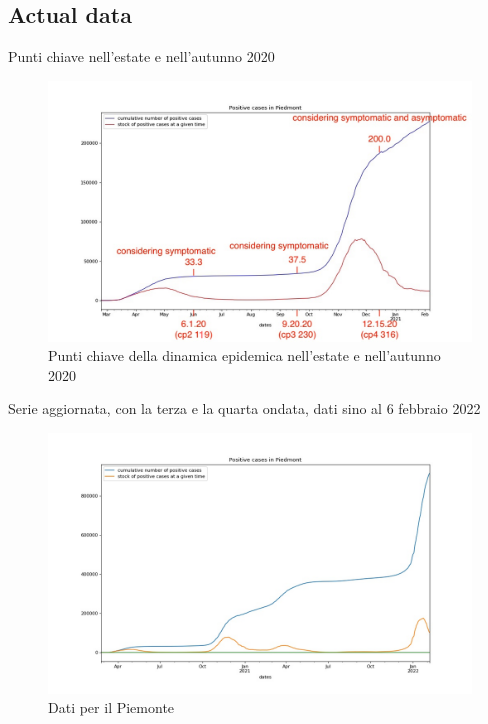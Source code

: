 \documentclass[]{beamer}
\begin{document}
\subsection{Actual data}

\begin{frame}{Punti chiave nell'estate e nell'autunno 2020}

\begin{figure}[H]
\center
\includegraphics[scale=0.25]{andamento900annotato.jpg}
\caption{Punti chiave della dinamica epidemica nell'estate e nell'autunno 2020}
\label{Key points}
\end{figure}


\end{frame}


\begin{frame}{Serie aggiornata, con la terza e la quarta ondata, dati sino al 6 febbraio 2022}

\begin{figure}[H]
\center
\includegraphics[scale=0.35]{andamento900.jpg}
\caption{Dati per il Piemonte}
\label{dataP}
\end{figure}


\end{frame}
\end{document}
